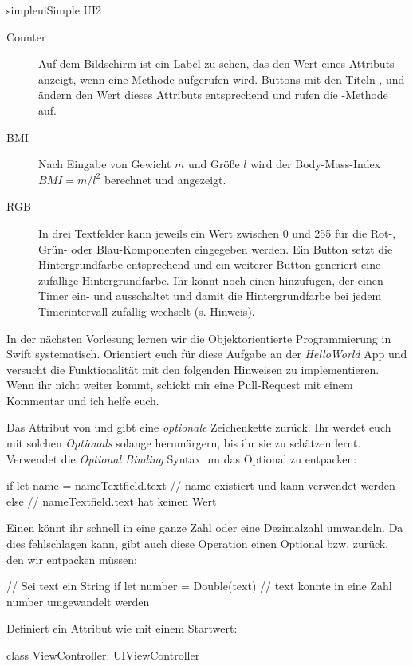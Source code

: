 \documentclass[parskip=half, final]{scrreprt}
\begin{document}
\begin{lecture}
\begin{exc}
\begin{excitem}{simpleui}{Simple UI}{2}
\begin{description}
\item[Counter] Auf dem Bildschirm ist ein Label zu sehen, das den Wert eines Attributs  anzeigt, wenn eine Methode  aufgerufen wird. Buttons mit den Titeln ,  und  ändern den Wert dieses Attributs entsprechend und rufen die -Methode auf.
\item[BMI] Nach Eingabe von Gewicht $m$ und Größe $l$ wird der Body-Mass-Index $BMI=m/l^2$ berechnet und angezeigt.
\item[RGB] In drei Textfelder kann jeweils ein Wert zwischen 0 und 255 für die Rot-, Grün- oder Blau-Komponenten eingegeben werden. Ein Button setzt die Hintergrundfarbe  entsprechend und ein weiterer Button generiert eine zufällige Hintergrundfarbe. Ihr könnt noch einen  hinzufügen, der einen Timer ein- und ausschaltet und damit die Hintergrundfarbe bei jedem Timerintervall zufällig wechselt (s. Hinweis).
\end{description}

\begin{exchinweise}
\item In der nächsten Vorlesung lernen wir die Objektorientierte Programmierung in Swift systematisch. Orientiert euch für diese Aufgabe an der \emph{HelloWorld} App und versucht die Funktionalität mit den folgenden Hinweisen zu implementieren. Wenn ihr nicht weiter kommt, schickt mir eine Pull-Request mit einem Kommentar und ich helfe euch.
\item Das Attribut  von  und  gibt eine \emph{optionale} Zeichenkette  zurück. Ihr werdet euch mit solchen \emph{Optionals} solange herumärgern, bis ihr sie zu schätzen lernt. Verwendet die \emph{Optional Binding} Syntax um das Optional zu entpacken:
\begin{swiftcode}
if let name = nameTextfield.text {
    // name existiert und kann verwendet werden
} else {
    // nameTextfield.text hat keinen Wert
}
\end{swiftcode}
\item Einen  könnt ihr schnell in eine ganze Zahl  oder eine Dezimalzahl  umwandeln. Da dies fehlschlagen kann, gibt auch diese Operation einen Optional  bzw.  zurück, den wir entpacken müssen:
	\begin{swiftcode}
    // Sei text ein String
    if let number = Double(text) {
        // text konnte in eine Zahl number umgewandelt werden
    }
	\end{swiftcode}
\item Definiert ein Attribut wie  mit einem Startwert:
\begin{swiftcode}
class ViewController: UIViewController {

}
\end{swiftcode}
\end{exchinweise}
\end{excitem}
\end{exc}
\end{lecture}
\end{document}
